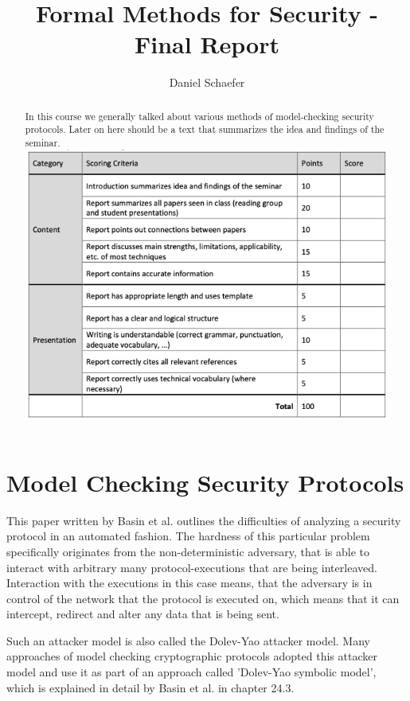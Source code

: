 \documentclass[a4paper,UKenglish]{lipics-v2018}
\title{Formal Methods for Security - Final Report}
\author{Daniel Schaefer}{2549458}{}{}{}
\begin{document}
\maketitle

\begin{abstract}
In this course we generally talked about various methods of model-checking security protocols. Later on here should be a text that summarizes the idea and findings of the seminar.\\

\includegraphics[scale = 0.72]{pictures/grading_scheme}\\
\end{abstract}


\newpage
\section{Model Checking Security Protocols}

This paper written by Basin et al. outlines the difficulties of analyzing a security protocol in an automated fashion. The hardness of this particular problem specifically originates from the non-deterministic adversary, that is able to interact with arbitrary many protocol-executions that are being interleaved. Interaction with the executions in this case means, that the adversary is in control of the network that the protocol is executed on, which means that it can intercept, redirect and alter any data that is being sent.\cite{model_checking_security_protocols}

Such an attacker model is also called the Dolev-Yao attacker model.  Many approaches of model checking cryptographic protocols adopted this attacker model and use it as part of an approach called 'Dolev-Yao symbolic model', which is explained in detail by Basin et al. in chapter 24.3.\cite{model_checking_security_protocols} 
\end{document}
